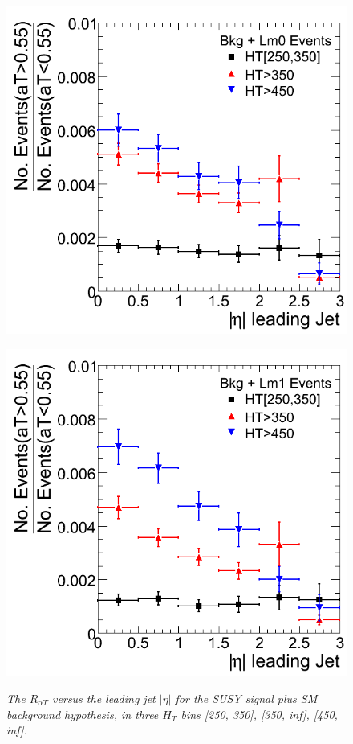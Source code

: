 \begin{figure}[h!]
\begin{minipage}[b]{0.5\linewidth}
\centering
{\label{fig:aT}\includegraphics[scale=0.38]{./plots/RaT-LM0.png}} 
\end{minipage}
\begin{minipage}[b]{0.5\linewidth}
\centering
{\label{fig:m$H_{T}$}\includegraphics[scale=0.38]{./plots/RaT-LM1.png}} 
\end{minipage}
\caption{\textit{The $R_{\alpha T}$ versus the leading jet $|\eta|$ for the SUSY signal plus SM background hypothesis, in three $H_{T}$ bins [250, 350], [350, inf], [450, inf].} }
\vspace{5mm}
\label{fig:id2}
\end{figure}


